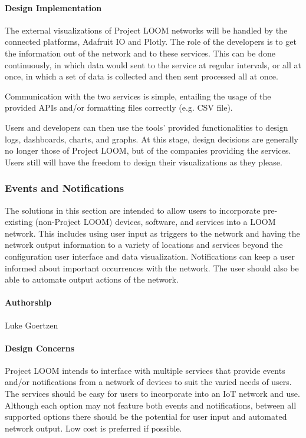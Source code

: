\documentclass[onecolumn, draftclsnofoot,10pt, compsoc]{IEEEtran}
\begin{document}
\paragraph{Design Implementation}
The external visualizations of Project LOOM networks will be handled by the connected platforms, Adafruit IO and Plotly. The role of the developers is to get the information out of the network and to these services. This can be done continuously, in which data would sent to the service at regular intervals, or all at once, in which a set of data is collected and then sent processed all at once. 

Communication with the two services is simple, entailing the usage of the provided APIs and/or formatting files correctly (e.g. CSV file).

Users and developers can then use the tools' provided functionalities to design logs, dashboards, charts, and graphs. At this stage, design decisions are generally no longer those of Project LOOM, but of the companies providing the services. Users still will have the freedom to design their visualizations as they please.


\subsubsection{Events and Notifications}
The solutions in this section are intended to allow users to incorporate pre-existing (non-Project LOOM) devices, software, and services into a LOOM network. This includes using user input as triggers to the network and having the network output information to a variety of locations and services beyond the configuration user interface and data visualization. Notifications can keep a user informed about important occurrences with the network. The user should also be able to automate output actions of the network.

\paragraph{Authorship}
Luke Goertzen

\paragraph{Design Concerns}
Project LOOM intends to interface with multiple services that provide events and/or notifications from a network of devices to suit the varied needs of users. The services should be easy for users to incorporate into an IoT network and use. Although each option may not feature both events and notifications, between all supported options there should be the potential for user input and automated network output. Low cost is preferred if possible.
\end{document}
